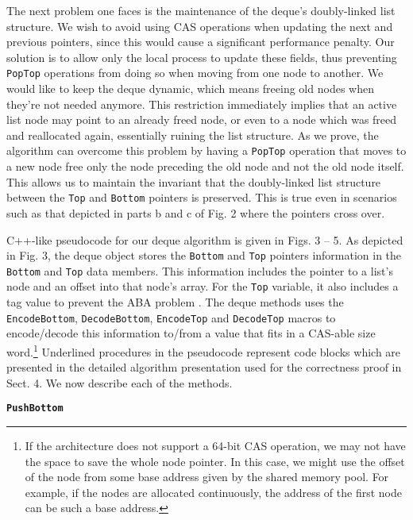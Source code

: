 The next problem one faces is the maintenance of the deque's
doubly-linked list structure. We wish to avoid using CAS operations
when updating the next and previous pointers, since this would cause a
significant performance penalty. Our solution is to allow only the
local process to update these fields, thus preventing
\lstinline!PopTop! operations from doing so when moving from one node
to another. We would like to keep the deque dynamic, which means
freeing old nodes when they're not needed anymore. This restriction
immediately implies that an active list node may point to an already
freed node, or even to a node which was freed and reallocated again,
essentially ruining the list structure. As we prove, the algorithm can
overcome this problem by having a \lstinline!PopTop! operation that
moves to a new node free only the node preceding the old node and not
the old node itself. This allows us to maintain the invariant that the
doubly-linked list structure between the \lstinline!Top! and
\lstinline!Bottom! pointers is preserved. This is true even in
scenarios such as that depicted in parts b and c of Fig. 2 where the
pointers cross over.


C++-like pseudocode for our deque algorithm is given in Figs. 3 --
5. As depicted in Fig. 3, the deque object stores the
\lstinline!Bottom! and \lstinline!Top! pointers information in the
\lstinline!Bottom! and \lstinline!Top! data members. This information
includes the pointer to a list's node and an offset into that node's
array. For the \lstinline!Top! variable, it also includes a tag value
to prevent the ABA problem \cite{Dechev2006}. The deque methods uses
the \lstinline!EncodeBottom!, \lstinline!DecodeBottom!,
\lstinline!EncodeTop! and \lstinline!DecodeTop! macros to
encode/decode this information to/from a value that fits in a CAS-able
size word.\footnote{If the architecture does not support a 64-bit CAS
  operation, we may not have the space to save the whole node
  pointer. In this case, we might use the offset of the node from some
  base address given by the shared memory pool. For example, if the
  nodes are allocated continuously, the address of the first node can
  be such a base address.} Underlined procedures in the pseudocode
represent code blocks which are presented in the detailed algorithm
presentation used for the correctness proof in Sect. 4. We now
describe each of the methods.

\textbf{\lstinline!PushBottom!}

